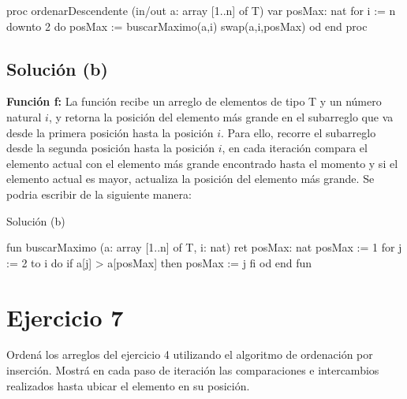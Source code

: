 \documentclass{article}
\begin{document}
\begin{codebox}
\begin{pascallike}
proc ordenarDescendente (in/out a: array [1..n] of T)
    var posMax: nat
    for i := n downto 2 do
    posMax := buscarMaximo(a,i)
    swap(a,i,posMax)
    od
end proc
\end{pascallike}
\end{codebox}

\subsection{Solución (b)}
\textbf{Función f:} La función recibe un arreglo de elementos de tipo T y un número natural $i$, y retorna la posición del elemento más grande en el subarreglo que va desde la primera posición hasta la posición $i$. Para ello, recorre el subarreglo desde la segunda posición hasta la posición $i$, en cada iteración compara el elemento actual con el elemento más grande encontrado hasta el momento y si el elemento actual es mayor, actualiza la posición del elemento más grande.
Se podria escribir de la siguiente manera:

\begin{codebox}{Solución (b)}
\begin{pascallike}
fun buscarMaximo (a: array [1..n] of T, i: nat) ret posMax: nat
    posMax := 1
    for j := 2 to i do
    if a[j] > a[posMax] then
        posMax := j
    fi
    od
end fun
\end{pascallike}
\end{codebox}

\section{Ejercicio 7}
Ordená los arreglos del ejercicio 4 utilizando el algoritmo de ordenación por inserción. Mostrá en cada paso de iteración las comparaciones e intercambios realizados hasta ubicar el elemento en su posición.
\end{document}
